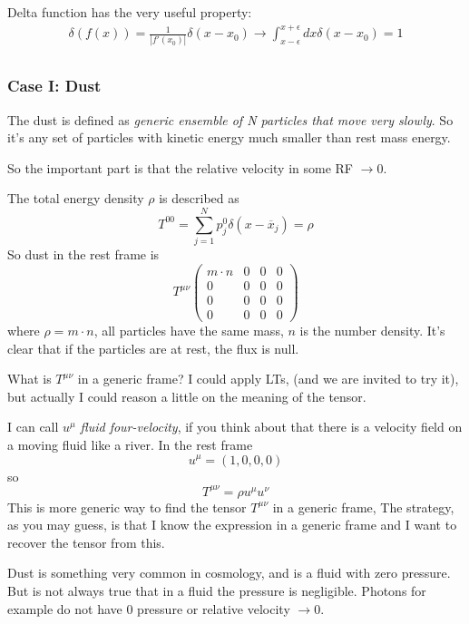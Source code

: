 Delta function has the very useful property:
\begin{gather*}
\delta\left( f\left( x \right) \right) = \frac{1}{\left| f'\left( x_{0} \right)\right|} \delta\left( x-x_{0} \right) \to \int_{x-\epsilon }^{x+\epsilon }{dx \delta \left( x-x_{0} \right)}=1\\
\end{gather*}

\subsubsection{Case I: Dust}
The dust is defined as \emph{generic ensemble of N particles that move very slowly}. So it's any set of particles with kinetic energy much smaller than rest mass energy.

So the important part is that the relative velocity in some RF $\to 0$.

The total energy density $\rho $ is described as 
\[
	T^{00} = \sum_{j = 1}^{N}{p^{0}_{j} \delta\left( x- \overline{x}_{j} \right)} = \rho 
\]
So dust in the rest frame is 
\begin{equation}
T^{\mu \nu }\begin{pmatrix}
m\cdot n & 0 & 0 & 0 \\
0 & 0 & 0 & 0 \\
0 & 0 & 0 & 0 \\
0 & 0 & 0 & 0
\end{pmatrix} 
\end{equation}
where $\rho = m\cdot n$, all particles have the same mass, $n$ is the number density. It's clear that if the particles are at rest, the flux is null.

What is $T^{\mu \nu }$ in a generic frame? I could apply LTs, (and we are invited to try it), but actually I could reason a little on the meaning of the tensor.

I can call $u^{\mu }$ \emph{fluid four-velocity}, if you think about that there is a velocity field on a moving fluid like a river. In the rest frame
\[
u^{\mu }= \left( 1,0,0,0 \right)
\]
so 
\[
T^{\mu \nu } = \rho u^{\mu }u^{\nu }
\]
This is more generic way to find the tensor $T^{\mu \nu }$ in a generic frame, The strategy, as you may guess, is that I know the expression in a generic frame and I want to recover the tensor from this.

Dust is something very common in cosmology, and is a fluid with zero pressure. But is not always true that in a fluid the pressure is negligible. Photons for example do not have 0 pressure or relative velocity $\to 0$.

